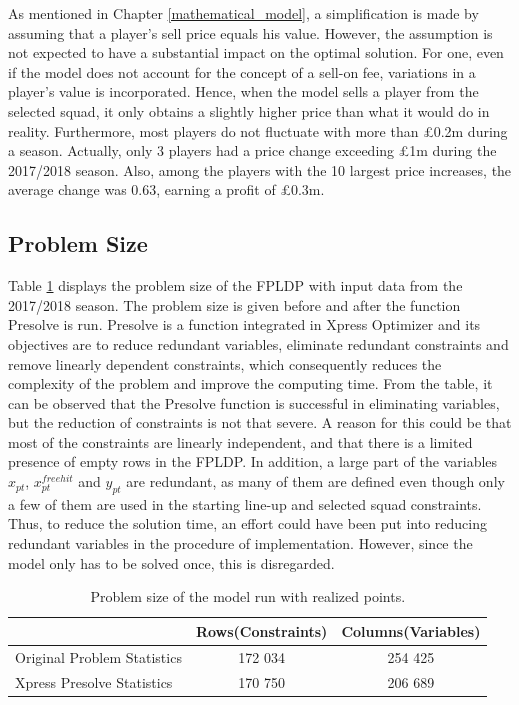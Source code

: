 As mentioned in Chapter \ref{mathematical_model}, a simplification is made by assuming that a player's sell price equals his value. However, the assumption is not expected to have a substantial impact on the optimal solution. For one, even if the model does not account for the concept of a sell-on fee, variations in a player's value is incorporated. Hence, when the model sells a player from the selected squad, it only obtains a slightly higher price than what it would do in reality. Furthermore, most players do not fluctuate with more than \pounds 0.2m during a season. Actually, only 3 players had a price change exceeding \pounds 1m during the 2017/2018 season. Also, among the players with the 10 largest price increases, the average change was 0.63, earning a profit of \pounds 0.3m.


\subsection{Problem Size}

Table \ref{tab:computational_statistics} displays the problem size of the FPLDP with input data from the 2017/2018 season. The problem size is given before and after the function Presolve is run. Presolve is a function integrated in Xpress Optimizer and its objectives are to reduce redundant variables, eliminate redundant constraints and remove linearly dependent constraints, which consequently reduces the complexity of the problem and improve the computing time. From the table, it can be observed that the Presolve function is successful in eliminating variables, but the reduction of constraints is not that severe. A reason for this could be that most of the constraints are linearly independent, and that there is a limited presence of empty rows in the FPLDP. In addition, a large part of the variables $x_{pt}$, $x_{pt}^{freehit}$ and $y_{pt}$ are redundant, as many of them are defined even though only a few of them are used in the starting line-up and selected squad constraints. Thus, to reduce the solution time, an effort could have been put into reducing redundant variables in the procedure of implementation. However, since the model only has to be solved once, this is disregarded.

\begin{table}[!htbp]
\centering
\begin{tabular}{@{}lcc@{}}
\toprule
                            & Rows(Constraints)    & Columns(Variables) 
                            \\ \midrule
Original Problem Statistics & 172 034 & 254 425   \\
Xpress Presolve Statistics  & 170 750 & 206 689   \\ 
\bottomrule
\end{tabular}
\caption{Problem size of the model run with realized points.}
\label{tab:computational_statistics}
\end{table}


